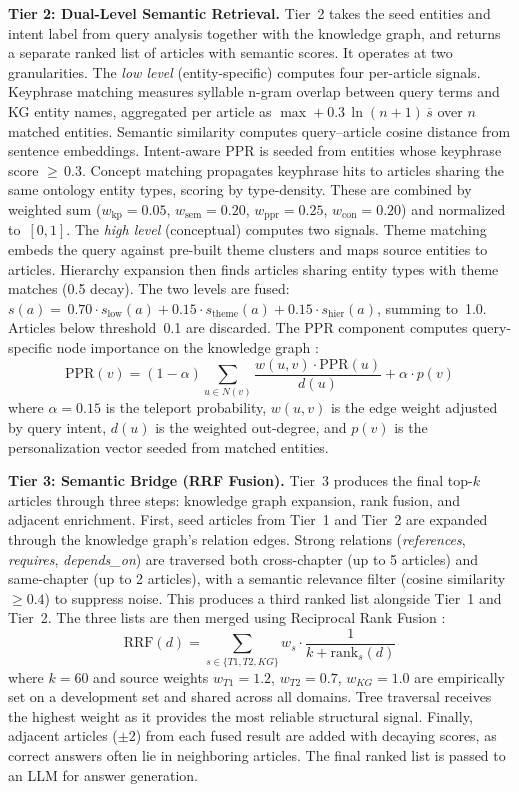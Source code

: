 \documentclass{IOS-Book-Article}
\begin{document}
\textbf{Tier 2: Dual-Level Semantic Retrieval.}
Tier~2 takes the seed entities and intent label from query analysis together with the knowledge graph, and returns a separate ranked list of articles with semantic scores. It operates at two granularities. The \textit{low level} (entity-specific) computes four per-article signals. Keyphrase matching measures syllable n-gram overlap between query terms and KG entity names, aggregated per article as $\max + 0.3\,\ln(n{+}1)\,\overline{s}$ over $n$ matched entities. Semantic similarity computes query--article cosine distance from sentence embeddings. Intent-aware PPR is seeded from entities whose keyphrase score ${\geq}\,0.3$. Concept matching propagates keyphrase hits to articles sharing the same ontology entity types, scoring by type-density. These are combined by weighted sum ($w_{\text{kp}}{=}0.05$, $w_{\text{sem}}{=}0.20$, $w_{\text{ppr}}{=}0.25$, $w_{\text{con}}{=}0.20$) and normalized to~$[0,1]$. The \textit{high level} (conceptual) computes two signals. Theme matching embeds the query against pre-built theme clusters and maps source entities to articles. Hierarchy expansion then finds articles sharing entity types with theme matches (0.5 decay). The two levels are fused: $s(a) {=}\, 0.70 \cdot s_{\text{low}}(a) + 0.15 \cdot s_{\text{theme}}(a) + 0.15 \cdot s_{\text{hier}}(a)$, summing to~1.0. Articles below threshold~0.1 are discarded. The PPR component computes query-specific node importance on the knowledge graph \cite{r30}:
\begin{equation}
\text{PPR}(v) = (1-\alpha) \sum_{u \in N(v)} \frac{w(u,v) \cdot \text{PPR}(u)}{d(u)} + \alpha \cdot p(v)
\end{equation}
where $\alpha=0.15$ is the teleport probability, $w(u,v)$ is the edge weight adjusted by query intent, $d(u)$ is the weighted out-degree, and $p(v)$ is the personalization vector seeded from matched entities.

\textbf{Tier 3: Semantic Bridge (RRF Fusion).}
Tier~3 produces the final top-$k$ articles through three steps: knowledge graph expansion, rank fusion, and adjacent enrichment. First, seed articles from Tier~1 and Tier~2 are expanded through the knowledge graph's relation edges. Strong relations (\textit{references}, \textit{requires}, \textit{depends\_on}) are traversed both cross-chapter (up to 5 articles) and same-chapter (up to 2 articles), with a semantic relevance filter (cosine similarity $\geq 0.4$) to suppress noise. This produces a third ranked list alongside Tier~1 and Tier~2. The three lists are then merged using Reciprocal Rank Fusion \cite{r28}:
\begin{equation}
\text{RRF}(d) = \sum_{s \in \{T1, T2, KG\}} w_s \cdot \frac{1}{k + \text{rank}_s(d)}
\end{equation}
where $k=60$ and source weights $w_{T1}=1.2$, $w_{T2}=0.7$, $w_{KG}=1.0$ are empirically set on a development set and shared across all domains. Tree traversal receives the highest weight as it provides the most reliable structural signal. Finally, adjacent articles ($\pm 2$) from each fused result are added with decaying scores, as correct answers often lie in neighboring articles. The final ranked list is passed to an LLM for answer generation.
\end{document}
